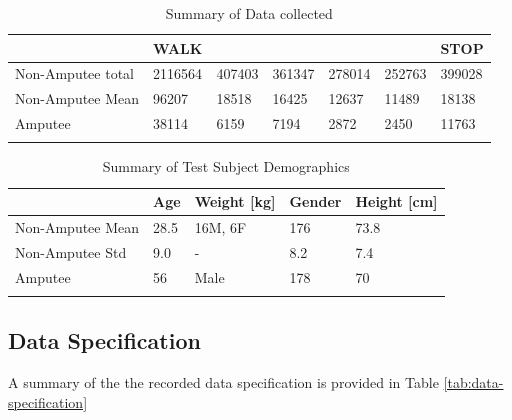 \begin{table}[!htb]
    \centering
    \caption{Summary of Data collected}
    \label{tab:methods-data-summary}
    \begin{tabularx}{\textwidth}{lYYYYYY}
                          & \textbf{WALK} & \textbf{} & \textbf{} & \textbf{} & \textbf{} & \textbf{STOP} \\
        \hline
        Non-Amputee total & 2116564       & 407403                      & 361347                      & 278014                      & 252763                      & 399028        \\
        Non-Amputee Mean  & 96207         & 18518                       & 16425                       & 12637                       & 11489                       & 18138         \\
        Amputee           & 38114         & 6159                        & 7194                        & 2872                        & 2450                        & 11763         \\
    \end{tabularx}
\end{table}

\begin{table}[!htb]
    \centering
    \caption{Summary of Test Subject Demographics}
    \label{tab:demographic-data-summary}
    \begin{tabularx}{\textwidth}{lYYYY}
                         & \textbf{Age} & \textbf{Weight [kg]} & \textbf{Gender} & \textbf{Height [cm]} \\
        \hline
        Non-Amputee Mean & 28.5         & 16M, 6F              & 176             & 73.8                 \\
        Non-Amputee Std  & 9.0          & -                    & 8.2             & 7.4                  \\
        Amputee          & 56           & Male                 & 178             & 70                   \\
    \end{tabularx}
\end{table}

\subsection{Data Specification}
A summary of the the recorded data specification is provided in Table \ref{tab:data-specification}

